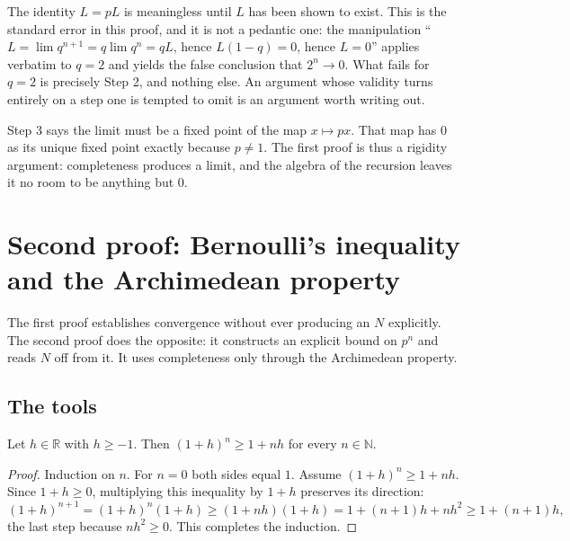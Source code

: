 \documentclass{essay}
\begin{document}
\begin{remark}\label{rem:error}
  The identity \(L = pL\) is meaningless until \(L\) has been shown to exist. This is the
  standard error in this proof, and it is not a pedantic one: the manipulation
  ``\(L = \lim q^{n+1} = q \lim q^{n} = qL\), hence \(L(1-q) = 0\), hence \(L = 0\)'' applies
  verbatim to \(q = 2\) and yields the false conclusion that \(2^{n} \to 0\). What fails
  for \(q = 2\) is precisely Step 2, and nothing else. An argument whose validity turns
  entirely on a step one is tempted to omit is an argument worth writing out.
\end{remark}

\begin{remark}
  Step 3 says the limit must be a fixed point of the map \(x \mapsto px\). That map has
  \(0\) as its unique fixed point exactly because \(p \neq 1\). The first proof is thus a
  rigidity argument: completeness produces a limit, and the algebra of the recursion
  leaves it no room to be anything but \(0\).
\end{remark}

\section{Second proof: Bernoulli's inequality and the Archimedean property}

The first proof establishes convergence without ever producing an \(N\) explicitly.
The second proof does the opposite: it constructs an explicit bound on \(p^{n}\) and
reads \(N\) off from it. It uses completeness only through the Archimedean property.

\subsection{The tools}

\begin{lemma}\label{lem:bernoulli}
  Let \(h \in \mathbb{R}\) with \(h \geq -1\). Then \((1+h)^{n} \geq 1 + nh\) for every
  \(n \in \mathbb{N}\).
\end{lemma}

\begin{proof}
  Induction on \(n\). For \(n = 0\) both sides equal \(1\). Assume \((1+h)^{n} \geq 1 + nh\).
  Since \(1 + h \geq 0\), multiplying this inequality by \(1 + h\) preserves its direction:
  \[ (1+h)^{n+1} = (1+h)^{n}(1+h) \geq (1 + nh)(1 + h) = 1 + (n+1)h + nh^{2} \geq 1 + (n+1)h, \]
  the last step because \(nh^{2} \geq 0\). This completes the induction.
\end{proof}
\end{document}
